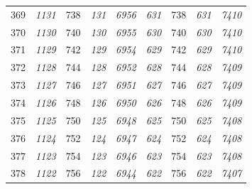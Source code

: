 \documentclass[10pt,fleqn]{article}
\begin{document}
\begin{longtable}{c|cccccccc}
369 & {\color{blue} \it 1131 \rm} & {\color{black} 738} & {\color{blue} \it 131 \rm} & {\color{blue} \it 6956 \rm} & {\color{blue} \it 631 \rm} & {\color{black} 738} & {\color{blue} \it 631 \rm} & {\color{blue} \it 7410 \rm} \\
370 & {\color{blue} \it 1130 \rm} & {\color{black} 740} & {\color{blue} \it 130 \rm} & {\color{blue} \it 6955 \rm} & {\color{blue} \it 630 \rm} & {\color{black} 740} & {\color{blue} \it 630 \rm} & {\color{blue} \it 7410 \rm} \\
371 & {\color{blue} \it 1129 \rm} & {\color{black} 742} & {\color{blue} \it 129 \rm} & {\color{blue} \it 6954 \rm} & {\color{blue} \it 629 \rm} & {\color{black} 742} & {\color{blue} \it 629 \rm} & {\color{blue} \it 7410 \rm} \\
372 & {\color{blue} \it 1128 \rm} & {\color{black} 744} & {\color{blue} \it 128 \rm} & {\color{blue} \it 6952 \rm} & {\color{blue} \it 628 \rm} & {\color{black} 744} & {\color{blue} \it 628 \rm} & {\color{blue} \it 7409 \rm} \\
373 & {\color{blue} \it 1127 \rm} & {\color{black} 746} & {\color{blue} \it 127 \rm} & {\color{blue} \it 6951 \rm} & {\color{blue} \it 627 \rm} & {\color{black} 746} & {\color{blue} \it 627 \rm} & {\color{blue} \it 7409 \rm} \\
374 & {\color{blue} \it 1126 \rm} & {\color{black} 748} & {\color{blue} \it 126 \rm} & {\color{blue} \it 6950 \rm} & {\color{blue} \it 626 \rm} & {\color{black} 748} & {\color{blue} \it 626 \rm} & {\color{blue} \it 7409 \rm} \\
375 & {\color{blue} \it 1125 \rm} & {\color{black} 750} & {\color{blue} \it 125 \rm} & {\color{blue} \it 6948 \rm} & {\color{blue} \it 625 \rm} & {\color{black} 750} & {\color{blue} \it 625 \rm} & {\color{blue} \it 7408 \rm} \\
376 & {\color{blue} \it 1124 \rm} & {\color{black} 752} & {\color{blue} \it 124 \rm} & {\color{blue} \it 6947 \rm} & {\color{blue} \it 624 \rm} & {\color{black} 752} & {\color{blue} \it 624 \rm} & {\color{blue} \it 7408 \rm} \\
377 & {\color{blue} \it 1123 \rm} & {\color{black} 754} & {\color{blue} \it 123 \rm} & {\color{blue} \it 6946 \rm} & {\color{blue} \it 623 \rm} & {\color{black} 754} & {\color{blue} \it 623 \rm} & {\color{blue} \it 7408 \rm} \\
378 & {\color{blue} \it 1122 \rm} & {\color{black} 756} & {\color{blue} \it 122 \rm} & {\color{blue} \it 6944 \rm} & {\color{blue} \it 622 \rm} & {\color{black} 756} & {\color{blue} \it 622 \rm} & {\color{blue} \it 7407 \rm} \\

\end{longtable}
\end{document}
